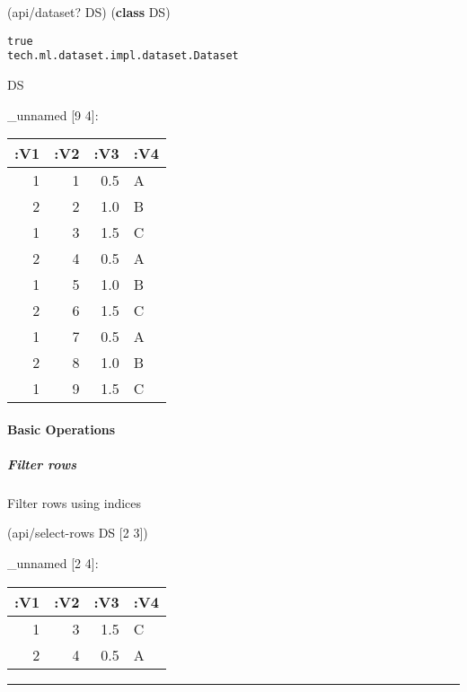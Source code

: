\documentclass[]{article}
\newenvironment{Shaded}{\begin{snugshade}}{\end{snugshade}}
\newcommand{\KeywordTok}[1]{\textcolor[rgb]{0.13,0.29,0.53}{\textbf{#1}}}
\newcommand{\DecValTok}[1]{\textcolor[rgb]{0.00,0.00,0.81}{#1}}
\newcommand{\NormalTok}[1]{#1}
\let\oldparagraph\paragraph
\renewcommand{\paragraph}[1]{\oldparagraph{#1}\mbox{}}
\let\oldsubparagraph\subparagraph
\renewcommand{\subparagraph}[1]{\oldsubparagraph{#1}\mbox{}}
\begin{document}
\begin{Shaded}
\begin{Highlighting}[]
\NormalTok{(api/dataset? DS)}
\NormalTok{(}\KeywordTok{class}\NormalTok{ DS)}
\end{Highlighting}
\end{Shaded}

\begin{verbatim}
true
tech.ml.dataset.impl.dataset.Dataset
\end{verbatim}

\begin{Shaded}
\begin{Highlighting}[]
\NormalTok{DS}
\end{Highlighting}
\end{Shaded}

\_unnamed {[}9 4{]}:

\begin{longtable}[]{@{}rrrl@{}}
\toprule
:V1 & :V2 & :V3 & :V4\tabularnewline
\midrule
\endhead
1 & 1 & 0.5 & A\tabularnewline
2 & 2 & 1.0 & B\tabularnewline
1 & 3 & 1.5 & C\tabularnewline
2 & 4 & 0.5 & A\tabularnewline
1 & 5 & 1.0 & B\tabularnewline
2 & 6 & 1.5 & C\tabularnewline
1 & 7 & 0.5 & A\tabularnewline
2 & 8 & 1.0 & B\tabularnewline
1 & 9 & 1.5 & C\tabularnewline
\bottomrule
\end{longtable}

\paragraph{Basic Operations}\label{basic-operations}

\subparagraph{Filter rows}\label{filter-rows}

Filter rows using indices

\begin{Shaded}
\begin{Highlighting}[]
\NormalTok{(api/select-rows DS [}\DecValTok{2} \DecValTok{3}\NormalTok{])}
\end{Highlighting}
\end{Shaded}

\_unnamed {[}2 4{]}:

\begin{longtable}[]{@{}rrrl@{}}
\toprule
:V1 & :V2 & :V3 & :V4\tabularnewline
\midrule
\endhead
1 & 3 & 1.5 & C\tabularnewline
2 & 4 & 0.5 & A\tabularnewline
\bottomrule
\end{longtable}

\begin{center}\rule{0.5\linewidth}{0.5pt}\end{center}
\end{document}
